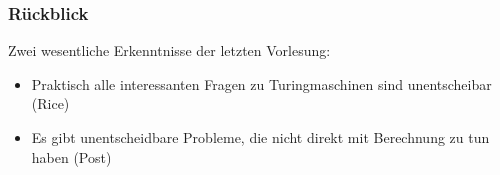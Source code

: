 \documentclass[onlymath]{beamer}
\begin{document}
\maketitle

\begin{frame}\frametitle{Rückblick}

Zwei wesentliche Erkenntnisse der letzten Vorlesung:

\begin{itemize}
\item Praktisch alle interessanten Fragen zu Turingmaschinen sind unentscheibar (Rice)
\item Es gibt unentscheidbare Probleme, die nicht direkt mit Berechnung zu tun haben (Post)
\end{itemize}

\end{frame}
\end{document}
